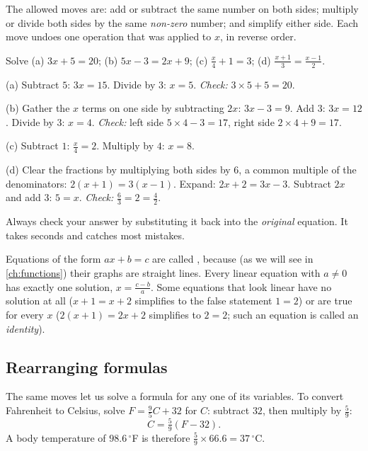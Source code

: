 The allowed moves are: add or subtract the same number on both sides; multiply
or divide both sides by the same \emph{non-zero} number; and simplify either
side. Each move undoes one operation that was applied to $x$, in reverse order.

\begin{example}\label{ex:linear-equations}
Solve (a) $3x + 5 = 20$; (b) $5x - 3 = 2x + 9$; (c) $\tfrac{x}{4} + 1 = 3$;
(d) $\tfrac{x+1}{3} = \tfrac{x-1}{2}$.

\sol
(a) Subtract $5$: $3x = 15$. Divide by $3$: $x = 5$.
\emph{Check:} $3\times5 + 5 = 20$. \checkmark

(b) Gather the $x$ terms on one side by subtracting $2x$: $3x - 3 = 9$. Add
$3$: $3x = 12$. Divide by $3$: $x = 4$.
\emph{Check:} left side $5\times4 - 3 = 17$, right side $2\times4+9 = 17$.
\checkmark

(c) Subtract $1$: $\tfrac{x}{4} = 2$. Multiply by $4$: $x = 8$.

(d) Clear the fractions by multiplying both sides by $6$, a common multiple of
the denominators: $2(x+1) = 3(x-1)$. Expand: $2x + 2 = 3x - 3$. Subtract $2x$
and add $3$: $5 = x$. \emph{Check:} $\tfrac{6}{3} = 2 = \tfrac42$. \checkmark
\end{example}

Always check your answer by substituting it back into the \emph{original}
equation. It takes seconds and catches most mistakes.

Equations of the form $ax + b = c$ are called , because (as we will see in \cref{ch:functions}) their graphs are
straight lines. Every linear equation with $a \neq 0$ has exactly one
solution, $x = \tfrac{c-b}{a}$. Some equations that look linear have no
solution at all ($x + 1 = x + 2$ simplifies to the false statement $1 = 2$) or
are true for every $x$ ($2(x+1) = 2x + 2$ simplifies to $2 = 2$; such an
equation is called an \emph{identity}).

\subsection{Rearranging formulas}

The same moves let us solve a formula for any one of its variables. To convert
Fahrenheit to Celsius, solve $F = \tfrac95 C + 32$ for $C$: subtract $32$, then
multiply by $\tfrac59$:
\[
  C = \tfrac59(F - 32).
\]
A body temperature of $98.6\,^\circ$F is therefore
$\tfrac59 \times 66.6 = 37\,^\circ$C.

